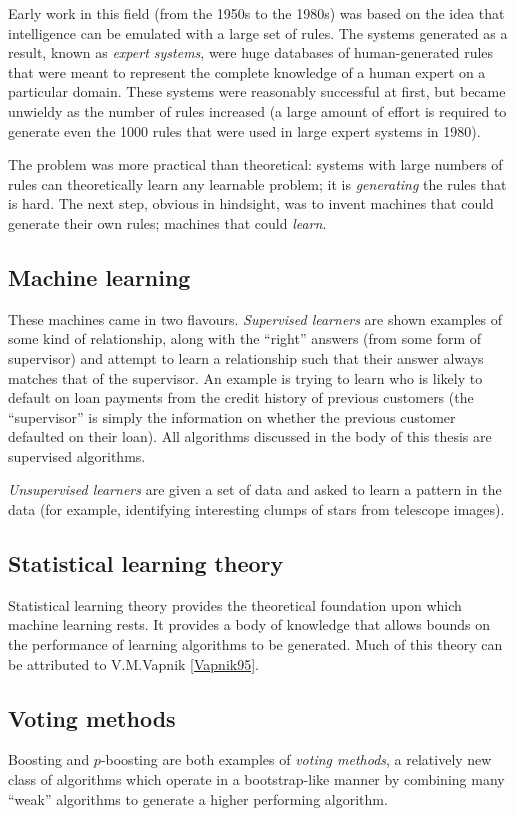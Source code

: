 Early work in this field (from the 1950s to the 1980s) was based on
the idea that intelligence can be emulated with a large set of rules.
The systems generated as a result, known as \emph{expert systems},
were huge databases of human-generated rules that were meant to
represent the complete knowledge of a human expert on a particular
domain.  These systems were reasonably successful at first, but became
unwieldy as the number of rules increased (a large amount of effort is
required to generate even the 1000 rules that were used in large
expert systems in 1980). 

The problem was more practical than theoretical: systems with large
numbers of rules can theoretically learn any learnable problem; it is
\emph{generating} the rules that is hard.  The next step, obvious in
hindsight, was to invent machines that could generate their own
rules; machines that could \emph{learn}.

\subsection{Machine learning}

These machines came in two flavours.  \emph{Supervised learners} are
shown examples of some kind of relationship, along with the ``right''
answers (from some form of supervisor) and attempt to learn a
relationship such that their answer always matches that of the
supervisor.  An example is trying to learn who is likely to default on
loan payments from the credit history of previous customers (the
``supervisor'' is simply the information on whether the previous
customer defaulted on their loan).  All algorithms discussed in the
body of this thesis are supervised algorithms.

\emph{Unsupervised learners} are given a set of data and asked to
learn a pattern in the data (for example, identifying interesting
clumps of stars from telescope images).

\subsection{Statistical learning theory}

Statistical learning theory provides the theoretical foundation upon
which machine learning rests.  It provides a body of knowledge that
allows bounds on the performance of learning algorithms to be
generated.  Much of this theory can be attributed to V.M.Vapnik
\ref{Vapnik95}.

\subsection{Voting methods}

Boosting and $p$-boosting are both examples of \emph{voting methods},
a relatively new class of algorithms which operate in a bootstrap-like
manner by combining many ``weak'' algorithms to generate a higher
performing algorithm.
